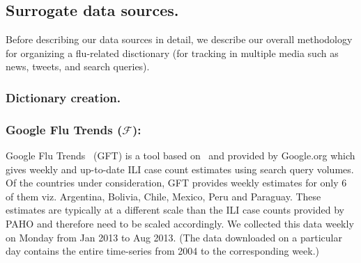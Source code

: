 

\subsection{Surrogate data sources.} Before
describing our data sources in detail, we describe our overall methodology
for organizing a flu-related disctionary (for tracking in multiple media such
as news, tweets, and search queries).

\subsubsection{\label{sec:keyword} Dictionary creation.} 

\subsubsection{Google Flu Trends ($\mathcal{F}$):}
Google Flu Trends~\cite{GFT:2013} (GFT) is a tool based
on~\cite{ginsberg2008detecting} and provided by Google.org which gives weekly
and up-to-date ILI case count estimates using search query volumes. 
Of the countries under
consideration, GFT provides weekly estimates for only 6 of them viz.  Argentina,
Bolivia, Chile, Mexico, Peru and Paraguay. 
These estimates are typically at
a different scale than the ILI case counts provided by PAHO and therefore need
to be scaled accordingly.  We collected this data weekly on Monday from Jan
2013 to Aug 2013. (The data downloaded on a particular day contains the entire
time-series from 2004 to the corresponding week.)
 
